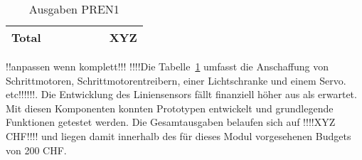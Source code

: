 \documentclass[main.tex]{subfiles} %
\begin{document}
\begin{table}[h]
{\begin{tabular}{|p{3cm}|p{2.5cm}|p{2.5cm}|p{3cm}|p{1cm}|p{1.5cm}|p{1cm}|}
            \textbf{Total}                    &                    &                              &                         &                 &                           & \textbf{XYZ}                \\ \hline
        \end{tabular}
    }
    \caption{Ausgaben PREN1}
    \label{tab:Ausgaben_PREN1}
\end{table}

!!anpassen wenn komplett!!!
!!!!Die Tabelle~\ref{tab:Ausgaben_PREN1} umfasst die Anschaffung von Schrittmotoren, Schrittmotorentreibern, einer
Lichtschranke und einem Servo. etc!!!!!!. Die Entwicklung des Liniensensors fällt finanziell höher aus als erwartet.
Mit diesen Komponenten konnten Prototypen entwickelt und grundlegende
Funktionen getestet werden. Die Gesamtausgaben belaufen sich auf !!!!XYZ CHF!!!! und liegen damit innerhalb des
für dieses Modul vorgesehenen Budgets von 200 CHF.
\end{document}
